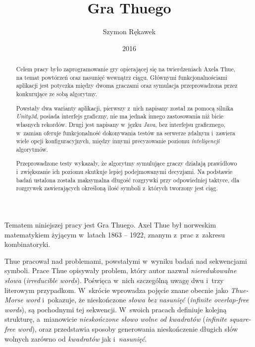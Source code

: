 \documentclass[document]{xmgr}
\author   {Szymon Rękawek}
\title    {Gra Thuego}
\date     {2016}
\begin{document}
\begin{abstract}
Celem pracy było zaprogramowanie gry opierającej się na twierdzeniach Axela Thue, na temat powtórzeń oraz nasunięć wewnątrz ciągu. Głównymi funkcjonalnościami aplikacji jest potyczka między dwoma graczami oraz symulacja przeprowadzona przez konkurujące ze sobą algorytmy. 

Powstały dwa warianty aplikacji, pierwszy z~nich napisany został za pomocą silnika \emph{Unity3d}, posiada interfejs graficzny, nie ma jednak innego zastosowania niż bicie własnych rekordów. Drugi jest napisany w~jęzku \emph{Java}, bez interfejsu graficznego, w~zamian oferuje funkcjonalność dokonywania testów na serwerze zdalnym i~zawiera wiele opcji konfiguracyjnych, między innymi precyzowanie poziomu \emph{inteligencji} algorytmów. 

Przeprowadzone testy wykazały, że algorytmy symulujące graczy działają prawidłowo i~zwiększanie ich poziomu skutkuje lepiej podejmowanymi decyzjami. Na podstawie badań ustalona została maksymalna długość rozgrywki przy odpowiedniej taktyce, dla rozgrywek zawierających określoną ilość symboli z~których tworzony jest ciąg.
\end{abstract}


\maketitle

\introduction

Tematem niniejszej pracy jest Gra Thuego. Axel Thue był norweskim matematykiem żyjącym w~latach 1863 -- 1922, znanym z~prac z~zakresu kombinatoryki.

Thue pracował nad problemami, powstałymi w~wyniku badań nad sekwencjami symboli. Prace Thue \cite{repetition} opisywały problem, który autor nazwał \emph{nieredukowalne słowa} (\emph{irreducible words}). Poświęca w~nich szczególną uwagę dwu i~trzy literowym przypadkom. W~skrócie wprowadza pojęcie znane obecnie jako \emph{Thue-Morse word} i~pokazuje, że nieskończone \emph{słowa bez nasunięć} (\emph{infinite overlap-free words}), są pochodnymi tej sekwencji. W~swoich pracach definiuje kolejną strukturę, a~mianowicie \emph{nieskończone słowo wolne od kwadratów}  (\emph{infinite square-free word}), oraz przedstawia sposoby generowania nieskończenie długich słów wolnych zarówno od \emph{kwadratów} jak i~\emph{nasunięć}.
\end{document}
